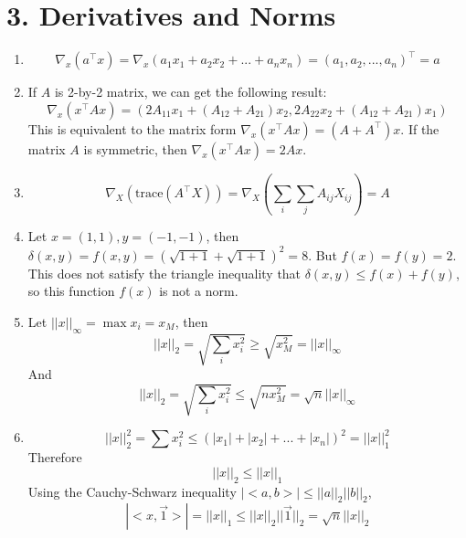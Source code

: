 \documentclass[11pt]{article}
\newenvironment{qparts}{\begin{enumerate}[{(}a{)}]}{\end{enumerate}}
\begin{document}
\newpage
\section*{3. Derivatives and Norms}
\begin{qparts}
\item $$\nabla_x (a^\top x) = \nabla_x (a_1x_1 + a_2x_2 + ... + a_nx_n) = (a_1, a_2, ..., a_n)^\top = a$$

\item If $A$ is 2-by-2 matrix, we can get the following result:
$$\nabla_x(x^\top Ax) = (2A_{11}x_1 + (A_{12}+A_{21})x_2, 2A_{22}x_2 + (A_{12}+A_{21})x_1)$$
This is equivalent to the matrix form $\nabla_x(x^\top Ax) = (A+A^\top)x$.
If the matrix $A$ is symmetric, then $\nabla_x(x^\top Ax) = 2Ax$.

\item $$\nabla_X(\mathrm{trace}(A^\top X)) = \nabla_X(\sum_i\sum_j A_{ij}X_{ij})=A$$


\item Let $x=(1, 1), y=(-1, -1)$, then $\delta(x, y) = f(x, y) = (\sqrt{1+1} +\sqrt{1+1})^2 = 8$. But $f(x) = f(y) = 2$. This does not satisfy the triangle inequality that $\delta(x, y)\leq f(x) + f(y)$, so this function $f(x)$ is not a norm.


\item Let $||x||_\infty = \max x_i = x_M$, then 
$$||x||_2 = \sqrt{\sum_i x_i^2} \geq \sqrt{x_M^2} = ||x||_\infty$$
And 
$$||x||_2 = \sqrt{\sum_i x_i^2} \leq \sqrt{nx_M^2} = \sqrt{n}||x||_\infty$$

\item $$||x||_2^2 = \sum x_i^2 \leq (|x_1| + |x_2| + ... + |x_n|)^2 = ||x||_1^2$$
Therefore $$||x||_2 \leq ||x||_1$$
Using the Cauchy-Schwarz inequality $|<a, b>| \leq ||a||_2||b||_2$,
$$|<x, \vec{1}>| = ||x||_1 \leq ||x||_2 ||\vec{1}||_2=\sqrt{n} ||x||_2$$
\end{qparts}


\newpage
\end{document}
